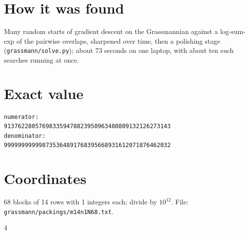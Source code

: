 \documentclass[11pt,a4paper]{article}
\begin{document}
\section{How it was found}
Many random starts of gradient descent on the Grassmannian against a log-sum-exp of the pairwise overlaps, sharpened over time, then a polishing stage (\texttt{grassmann/solve.py}); about 73 seconds on one laptop, with about ten such searches running at once.


\appendix
\section{Exact value}
{\small
\begin{verbatim}
numerator:
913762280576983359478823950963480809132126273143
denominator:
999999999998735364891768395668931612071876462032
\end{verbatim}}

\section{Coordinates}
68 blocks of 14 rows with 1 integers each; divide by $10^{12}$. File: \texttt{grassmann/packings/m14n1N68.txt}.
{\tiny
\begin{multicols}{4}
\end{multicols}}
\end{document}
